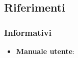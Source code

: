 	\subsection{Riferimenti} %
	\label{sub:riferimenti}


		\subsubsection{Informativi} %
		\label{ssub:informativi}
			\begin{itemize}
				\item \textbf{Manuale utente}: \docNameVersionMU
			\end{itemize}



